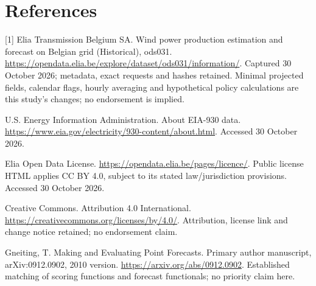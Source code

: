 \documentclass[10pt,letterpaper]{article}
\begin{document}
\section*{References}
{\footnotesize
[1] Elia Transmission Belgium SA. Wind power production estimation and forecast on Belgian grid (Historical), ods031. \url{https://opendata.elia.be/explore/dataset/ods031/information/}. Captured 30 October 2026; metadata, exact requests and hashes retained. Minimal projected fields, calendar flags, hourly averaging and hypothetical policy calculations are this study's changes; no endorsement is implied.\par
[2] U.S. Energy Information Administration. About EIA-930 data. \url{https://www.eia.gov/electricity/930-content/about.html}. Accessed 30 October 2026.\par
[3] Elia Open Data License. \url{https://opendata.elia.be/pages/licence/}. Public license HTML applies CC BY 4.0, subject to its stated law/jurisdiction provisions. Accessed 30 October 2026.\par
[4] Creative Commons. Attribution 4.0 International. \url{https://creativecommons.org/licenses/by/4.0/}. Attribution, license link and change notice retained; no endorsement claim.\par
[5] Gneiting, T. Making and Evaluating Point Forecasts. Primary author manuscript, arXiv:0912.0902, 2010 version. \url{https://arxiv.org/abs/0912.0902}. Established matching of scoring functions and forecast functionals; no priority claim here.}
\end{document}

